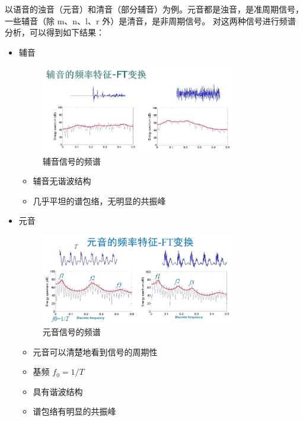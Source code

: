 \begin{example}[准周期信号的 FT]
    以语音的浊音（元音）和清音（部分辅音）为例。元音都是浊音，是准周期信号，
    一些辅音（除 m、n、l、r 外）是清音，是非周期信号。
    对这两种信号进行频谱分析，可以得到如下结果：
    \begin{itemize}
        \item 辅音
        \begin{figure}[H]
            \centering
            \includegraphics[width = 0.8\textwidth]{chap2/img/consonant.png}
            \caption{辅音信号的频谱}
            \label{fig:consonant}
        \end{figure}
        \begin{itemize}
            \item 辅音无谐波结构
            \item 几乎平坦的谱包络，无明显的共振峰
        \end{itemize}
        \item 元音
            \begin{figure}[H]
                \centering
                \includegraphics[width = 0.8\textwidth]{chap2/img/vowel.png}
                \caption{元音信号的频谱}
                \label{fig:vowel}
            \end{figure}
            \begin{itemize}
                \item 元音可以清楚地看到信号的周期性
                \item 基频 $f_0 = 1/T$
                \item 具有谐波结构
                \item 谱包络有明显的共振峰
            \end{itemize}
    \end{itemize}
\end{example}

